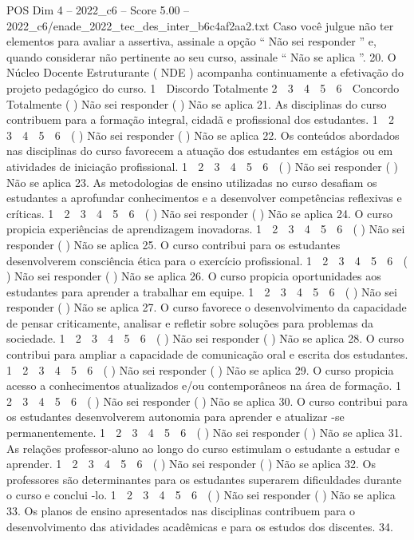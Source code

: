 \begin{textsample}{POS Dim 4 – 2022\_c6 – Score 5.00 – 2022\_c6/enade\_2022\_tec\_des\_inter\_b6c4af2aa2.txt}
Caso você julgue não ter elementos para avaliar a assertiva, assinale a opção “ Não sei responder ” e, quando considerar não pertinente ao seu curso, assinale “ Não se aplica ”. 20.
O Núcleo Docente Estruturante ( NDE ) acompanha continuamente a efetivação do projeto pedagógico do curso. 1 ⃝ Discordo Totalmente 2 ⃝ 3 ⃝ 4 ⃝ 5 ⃝ 6 ⃝ Concordo Totalmente ( ) Não sei responder ( ) Não se aplica 21.
As disciplinas do curso contribuem para a formação integral, cidadã e profissional dos estudantes. 1 ⃝ 2 ⃝ 3 ⃝ 4 ⃝ 5 ⃝ 6 ⃝ ( ) Não sei responder ( ) Não se aplica 22.
Os conteúdos abordados nas disciplinas do curso favorecem a atuação dos estudantes em estágios ou em atividades de iniciação profissional. 1 ⃝ 2 ⃝ 3 ⃝ 4 ⃝ 5 ⃝ 6 ⃝ ( ) Não sei responder ( ) Não se aplica 23.
As metodologias de ensino utilizadas no curso desafiam os estudantes a aprofundar conhecimentos e a desenvolver competências reflexivas e críticas. 1 ⃝ 2 ⃝ 3 ⃝ 4 ⃝ 5 ⃝ 6 ⃝ ( ) Não sei responder ( ) Não se aplica 24.
O curso propicia experiências de aprendizagem inovadoras. 1 ⃝ 2 ⃝ 3 ⃝ 4 ⃝ 5 ⃝ 6 ⃝ ( ) Não sei responder ( ) Não se aplica 25.
O curso contribui para os estudantes desenvolverem consciência ética para o exercício profissional. 1 ⃝ 2 ⃝ 3 ⃝ 4 ⃝ 5 ⃝ 6 ⃝ ( ) Não sei responder ( ) Não se aplica 26.
O curso propicia oportunidades aos estudantes para aprender a trabalhar em equipe. 1 ⃝ 2 ⃝ 3 ⃝ 4 ⃝ 5 ⃝ 6 ⃝ ( ) Não sei responder ( ) Não se aplica 27.
O curso favorece o desenvolvimento da capacidade de pensar criticamente, analisar e refletir sobre soluções para problemas da sociedade. 1 ⃝ 2 ⃝ 3 ⃝ 4 ⃝ 5 ⃝ 6 ⃝ ( ) Não sei responder ( ) Não se aplica 28.
O curso contribui para ampliar a capacidade de comunicação oral e escrita dos estudantes. 1 ⃝ 2 ⃝ 3 ⃝ 4 ⃝ 5 ⃝ 6 ⃝ ( ) Não sei responder ( ) Não se aplica 29.
O curso propicia acesso a conhecimentos atualizados e/ou contemporâneos na área de formação. 1 ⃝ 2 ⃝ 3 ⃝ 4 ⃝ 5 ⃝ 6 ⃝ ( ) Não sei responder ( ) Não se aplica 30.
O curso contribui para os estudantes desenvolverem autonomia para aprender e atualizar -se permanentemente. 1 ⃝ 2 ⃝ 3 ⃝ 4 ⃝ 5 ⃝ 6 ⃝ ( ) Não sei responder ( ) Não se aplica 31.
As relações professor-aluno ao longo do curso estimulam o estudante a estudar e aprender. 1 ⃝ 2 ⃝ 3 ⃝ 4 ⃝ 5 ⃝ 6 ⃝ ( ) Não sei responder ( ) Não se aplica 32.
Os professores são determinantes para os estudantes superarem dificuldades durante o curso e conclui -lo. 1 ⃝ 2 ⃝ 3 ⃝ 4 ⃝ 5 ⃝ 6 ⃝ ( ) Não sei responder ( ) Não se aplica 33.
Os planos de ensino apresentados nas disciplinas contribuem para o desenvolvimento das atividades acadêmicas e para os estudos dos discentes. 34.

\end{textsample}
